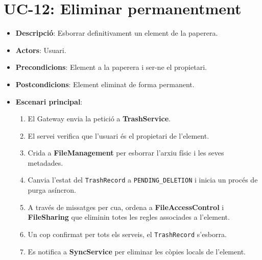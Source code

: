 \section{UC-12: Eliminar permanentment}
\begin{itemize}
  \item \textbf{Descripció}: Esborrar definitivament un element de la paperera.
  \item \textbf{Actors}: Usuari.
  \item \textbf{Precondicions}: Element a la paperera i ser-ne el propietari.
  \item \textbf{Postcondicions}: Element eliminat de forma permanent.
  \item \textbf{Escenari principal}:
    \begin{enumerate}
        \item El Gateway envia la petició a \textbf{TrashService}.
        \item El servei verifica que l'usuari és el propietari de l'element.
        \item Crida a \textbf{FileManagement} per esborrar l'arxiu físic i les seves metadades.
        \item Canvia l'estat del \texttt{TrashRecord} a \texttt{PENDING\_DELETION} i inicia un procés de purga asíncron.
        \item A través de missatges per cua, ordena a \textbf{FileAccessControl} i \textbf{FileSharing} que eliminin totes les regles associades a l'element.
        \item Un cop confirmat per tots els serveis, el \texttt{TrashRecord} s'esborra.
        \item Es notifica a \textbf{SyncService} per eliminar les còpies locals de l'element.
    \end{enumerate}
\end{itemize}

